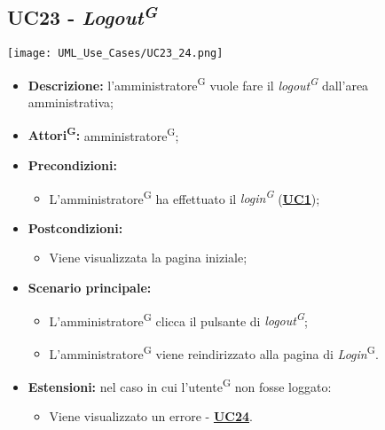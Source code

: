 \subsection{UC23 - \textit{Logout\textsuperscript{G}}}
\label{sec:UC23}
\texttt{[image: UML\_Use\_Cases/UC23\_24.png]}
\begin{itemize}
	\item \textbf{Descrizione:} l'amministratore\textsuperscript{G} vuole fare il \textit{logout\textsuperscript{G}} dall'area amministrativa; 
	\item \textbf{Attori\textsuperscript{G}:} amministratore\textsuperscript{G};
	\item \textbf{Precondizioni:} 
	\begin{itemize}
		\item L’amministratore\textsuperscript{G} ha effettuato il \textit{login\textsuperscript{G}} (\hyperref[sec:UC1]{\textbf{UC1}});
	\end{itemize}
	\item \textbf{Postcondizioni:} 
	\begin{itemize}
		\item Viene visualizzata la pagina iniziale;
	\end{itemize}
	\item \textbf{Scenario principale:} 
	\begin{itemize}
		\item L’amministratore\textsuperscript{G} clicca il pulsante di \textit{logout\textsuperscript{G}};
		\item L’amministratore\textsuperscript{G} viene reindirizzato alla pagina di \textit{Login}\textsuperscript{G}.
	\end{itemize}
	\item \textbf{Estensioni:} nel caso in cui l'utente\textsuperscript{G} non fosse loggato:
	\begin{itemize}
		\item Viene visualizzato un errore - \hyperref[sec:UC24]{\textbf{UC24}}.
	\end{itemize}
\end{itemize}


